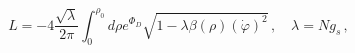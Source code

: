 \begin{equation}
\label{lag1}
L = -4 \frac{\sqrt{\lambda }}{2\pi} \int_0^{\rho_0} d\rho e^{\Phi_D}
\sqrt{ 1- \lambda \beta(\rho)
\left(\dot{\varphi}\right)^2 }\,, \quad \lambda= N g_s\,,
\end{equation}

